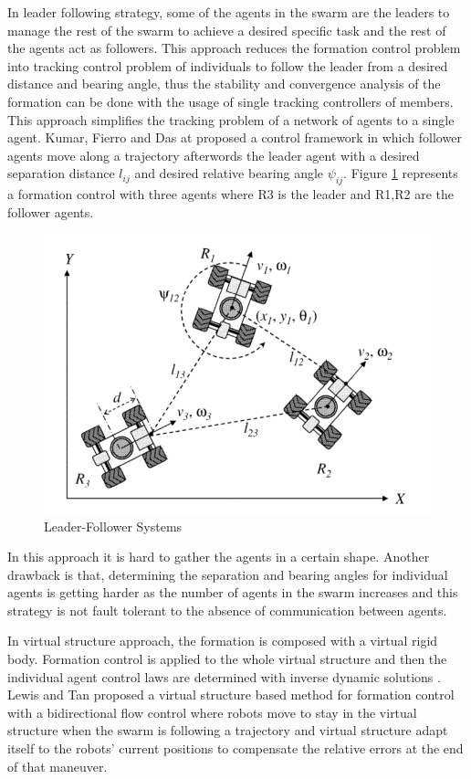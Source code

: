 In leader following strategy, some of the agents in the swarm are the leaders to manage the rest of the swarm to achieve a desired specific task and the rest of the agents act as followers. This approach reduces the formation control problem into tracking control problem of individuals to follow the leader from a desired distance and bearing angle, thus the stability and convergence analysis of the formation can be done with the usage of single tracking controllers of members. This approach simplifies the tracking problem of a network of agents to a single agent. Kumar, Fierro and Das at \cite{18} proposed a control framework in which follower agents move along a trajectory afterwords the leader agent with a desired separation distance $l_{ij}$ and desired relative bearing angle $\psi_{ij}$.  Figure \ref{leader_follower_ref} represents a formation control with three agents where R3 is the leader and R1,R2 are the follower agents. 

\begin{figure}[H]
	\caption{Leader-Follower Systems \cite{18}} \label{leader_follower_ref}
	\centering
	\includegraphics[scale = 0.5]{leader}
\end{figure}


In this approach it is hard to gather the agents in a certain shape. Another drawback is that, determining the separation and bearing angles for individual agents is getting harder as the number of agents in the swarm increases and this strategy is not fault tolerant to the absence of communication between agents.


In virtual structure approach, the formation is composed with a virtual rigid body. Formation control is applied to the whole virtual structure and then the individual agent control laws are determined with inverse dynamic solutions \cite{12}.  Lewis and Tan \cite{23} proposed a virtual structure based method for formation control  with a bidirectional flow control where robots move to stay in the virtual structure when the swarm is following a trajectory and virtual structure adapt itself to the robots' current positions to compensate the relative errors at the end of that maneuver. 

